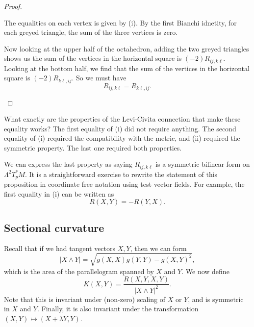 \documentclass[a4paper]{article}
\begin{document}
\begin{proof}
\begin{enumerate}
\begin{center}
      \end{center}
      The equalities on each vertex is given by (i). By the first Bianchi idnetity, for each greyed triangle, the sum of the three vertices is zero.

      Now looking at the upper half of the octahedron, adding the two greyed triangles shows us the sum of the vertices in the horizontal square is $(-2) R_{ij, k\ell}$. Looking at the bottom half, we find that the sum of the vertices in the horizontal square is $(-2)R_{k\ell, ij}$. So we must have
      \[
        R_{ij, k\ell} = R_{k\ell, ij}.
      \]
  \end{enumerate}
\end{proof}
What exactly are the properties of the Levi-Civita connection that make these equality works? The first equality of (i) did not require anything. The second equality of (i) required the compatibility with the metric, and (ii) required the symmetric property. The last one required both properties.

We can express the last property as saying $R_{ij, k\ell}$ is a symmetric bilinear form on $\Lambda^2 T_p^*M$. It is a straightforward exercise to rewrite the statement of this proposition in coordinate free notation using test vector fields. For example, the first equality in (i) can be written as
\[
  R(X, Y) = -R(Y, X).
\]
\subsection{Sectional curvature}
Recall that if we had tangent vectors $X, Y$, then we can form
\[
  |X \wedge Y| = \sqrt{g(X, X)g(Y, Y) - g(X, Y)^2},
\]
which is the area of the parallelogram spanned by $X$ and $Y$. We now define
\[
  K(X, Y) = \frac{R(X, Y, X, Y)}{|X \wedge Y|^2}.
\]
Note that this is invariant under (non-zero) scaling of $X$ or $Y$, and is symmetric in $X$ and $Y$. Finally, it is also invariant under the transformation $(X, Y) \mapsto (X + \lambda Y, Y)$.
\end{document}
